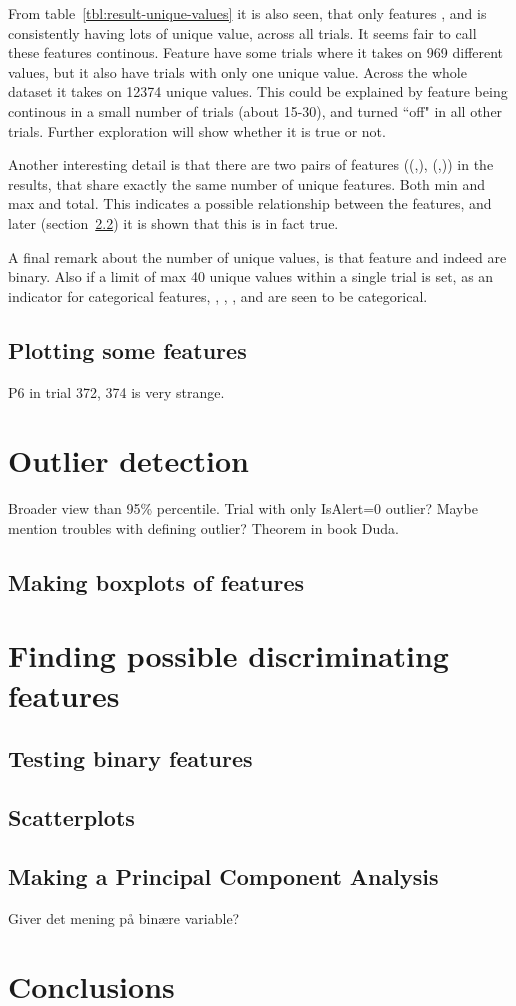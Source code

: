 From table~\ref{tbl:result-unique-values} it is also seen, that only features ,  and  is consistently having lots of unique value, across all trials. It seems fair to call these features continous. Feature  have some trials where it takes on 969 different values, but it also have trials with only one unique value. Across the whole dataset it takes on 12374 unique values. This could be explained by feature  being continous in a small number of trials (about 15-30), and turned ``off" in all other trials. Further exploration will show whether it is true or not. \par

Another interesting detail is that there are two pairs of features ((,), (,)) in the results, that share exactly the same number of unique features. Both min and max and total. This indicates a possible relationship between the features, and later (section~\ref{sec:scatterplots}) it is shown that this is in fact true. \par

A final remark about the number of unique values, is that feature  and  indeed are binary. Also if a limit of max 40 unique values within a single trial is set, as an indicator for categorical features, , , ,  and  are seen to be categorical. \par

\subsection{Plotting some features}
P6 in trial 372, 374 is very strange.


\section{Outlier detection}\label{sec:outlier-detection}
Broader view than 95\% percentile. Trial with only IsAlert=0 outlier? Maybe mention troubles with defining outlier? Theorem in book Duda.
\subsection{Making boxplots of features}

\section{Finding possible discriminating features}
\subsection{Testing binary features}
\subsection{Scatterplots}\label{sec:scatterplots}
\subsection{Making a Principal Component Analysis}
Giver det mening på binære variable?

\section{Conclusions}
